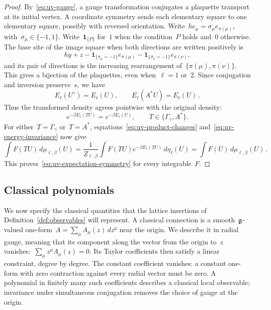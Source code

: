 \begin{proof}
By~\eqref{eq:uv-gauge}, a gauge transformation conjugates a plaquette transport at its initial vertex.
A coordinate symmetry sends each elementary square to one elementary square, possibly with reversed orientation.
Write~$he_\mu=\sigma_\mu e_{\pi(\mu)}$, with~$\sigma_\mu\in\{-1,1\}$.
Write~$\mathbf1_{\{P\}}$ for~$1$ when the condition~$P$ holds and~$0$ otherwise.
The base site of the image square when both directions are written positively is
\begin{equation*}
 hy+z-\mathbf1_{\{\sigma_\mu=-1\}}e_{\pi(\mu)}
      -\mathbf1_{\{\sigma_\nu=-1\}}e_{\pi(\nu)},
\end{equation*}
and its pair of directions is the increasing rearrangement of~$\{\pi(\mu),\pi(\nu)\}$. This gives a bijection of the plaquettes, even when~$\ell=1$ or~$2$.
Since conjugation and inversion preserve~$s$, we have
\begin{equation}\label{eq:uv-energy-invariance}
 E_\ell(U^\gamma)=E_\ell(U),\qquad E_\ell(A^*U)=E_\ell(U)\,.
\end{equation}
Thus the transformed density agrees pointwise with the original density:
\begin{equation*}
 e^{-\beta E_\ell(TU)}=e^{-\beta E_\ell(U)},
 \qquad T\in\{\Gamma_\gamma,A^*\}.
\end{equation*}
For either~$T=\Gamma_\gamma$ or~$T=A^*$, equations~\eqref{eq:uv-product-changes} and~\eqref{eq:uv-energy-invariance} now give
\begin{equation*}
 \int F(TU)\,d\mu_{\ell,\beta}(U)
 =\frac{1}{Z_{\ell,\beta}}\int F(TU)e^{-\beta E_\ell(TU)}\,d\eta_\ell(U)
 =\int F(U)\,d\mu_{\ell,\beta}(U)\,.
\end{equation*}
This proves~\eqref{eq:uv-expectation-symmetry} for every integrable~$F$.
\end{proof}

\subsection{Classical polynomials}\label{subsec:uv-labels}

We now specify the classical quantities that the lattice insertions of Definition~\ref{def:observables} will represent.
A classical connection is a smooth~$\mathfrak g$-valued one-form~$A=\sum_\mu A_\mu(z)\,dz^\mu$ near the origin.
We describe it in radial gauge, meaning that its component along the vector from the origin to~$z$ vanishes:~$\sum_\mu z^\mu A_\mu(z)=0$.
Its Taylor coefficients then satisfy a linear constraint, degree by degree.
The constant coefficient vanishes: a constant one-form with zero contraction against every radial vector must be zero.
A polynomial in finitely many such coefficients describes a classical local observable; invariance under simultaneous conjugation removes the choice of gauge at the origin.

